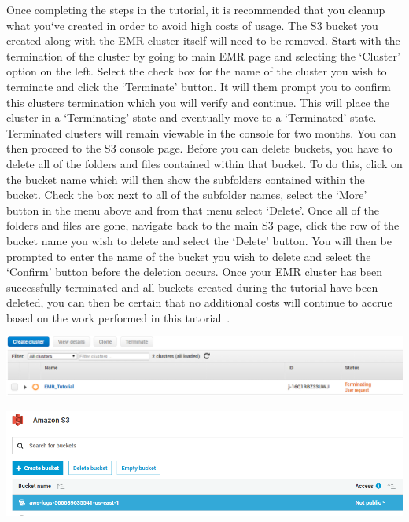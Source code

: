 Once completing the steps in the tutorial, it is recommended that you cleanup 
what you`ve created in order to avoid high costs of usage. The S3 bucket you 
created along with the EMR cluster itself will need to be removed. Start with 
the termination of the cluster by going to main EMR page and selecting the 
`Cluster' option on the left. Select the check box for the name of the cluster 
you wish to terminate and click the `Terminate' button. It will them prompt 
you to confirm this clusters termination which you will verify and continue. 
This will place the cluster in a `Terminating' state and eventually move to 
a `Terminated' state. Terminated clusters will remain viewable in the console 
for two months. You can then proceed to the S3 console page. Before you can 
delete buckets, you have to delete all of the folders and files contained 
within that bucket. To do this, click on the bucket name which will then show 
the subfolders contained within the bucket. Check the box next to all of the 
subfolder names, select the `More' button in the menu above and from that 
menu select `Delete'. Once all of the folders and files are gone, navigate 
back to the main S3 page, click the row of the bucket name you wish to delete 
and select the `Delete' button. You will then be prompted to enter the name 
of the bucket you wish to delete and select the `Confirm' button before the 
deletion occurs. Once your EMR cluster has been successfully terminated and 
all buckets created during the tutorial have been deleted, you can then be 
certain that no additional costs will continue to accrue based on the work 
performed in this tutorial~\cite{hid-sp18-521-emrreset}.  

\begin{center}
\includegraphics[width=\columnwidth]{images/emr_terminate.png}

\includegraphics[width=\columnwidth]{images/s3_delete_bucket.png}
\end{center}
